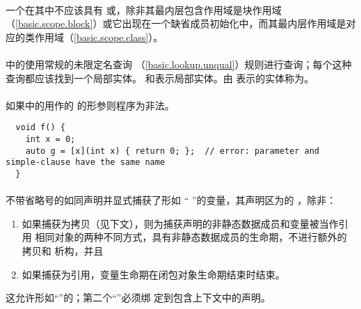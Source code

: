 \paragraph{} %
一个在其中不应该具有
或，除非其最内层包含作用域是块作用域
（\ref{basic.scope.block}）或它出现在一个缺省成员初始化中，而其最内层作用域是对
应的类作用域（\ref{basic.scope.class}）。

\paragraph{} %
中的使用常规的未限定名查询
（\ref{basic.lookup.unqual}）规则进行查询；每个这种查询都应该找到一个局部实体。
 和表示局部实体。由
表示的实体称为。

\paragraph{} %
如果中的用作的
的形参则程序为非法。

\begin{example}
  \begin{lstlisting}
  void f() {
    int x = 0;
    auto g = [x](int x) { return 0; };  // error: parameter and simple-clause have the same name
  }
  \end{lstlisting}
\end{example}

\paragraph{} %
不带省略号的如同声明并显式捕获了形如
“  \tm{;}”的变量，其声明区为的
，除非：
\begin{enumerate}
  \item 如果捕获为拷贝（见下文），则为捕获声明的非静态数据成员和变量被当作引用
        相同对象的两种不同方式，具有非静态数据成员的生命期，不进行额外的拷贝和
        析构，并且
  \item 如果捕获为引用，变量生命期在闭包对象生命期结束时结束。
\end{enumerate}

\begin{note}
  这允许形如“”的；第二个“”必须绑
  定到包含上下文中的声明。
\end{note}

